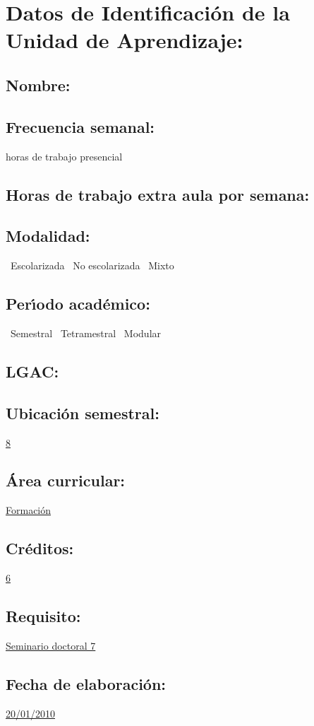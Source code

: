 \documentclass[10 pt]{article}
\begin{document}


\section{Datos de Identificaci\'{o}n de la Unidad de Aprendizaje:}
\subsection{Nombre:} 
\subsection{Frecuencia semanal:} horas de trabajo presencial 
\subsection{Horas de trabajo extra aula por semana:} 
\subsection{Modalidad:} \yes~Escolarizada \no~No escolarizada \no~Mixto
\subsection{Per\'{\i}odo acad\'{e}mico:} \yes~Semestral
\no~Tetramestral \no~Modular
\subsection{LGAC:} \underline{\odsi}
\subsection{Ubicaci\'{o}n semestral:} \underline{8}
\subsection{\'{A}rea curricular:} \underline{Formaci\'{o}n}
\subsection{Cr\'{e}ditos:} \underline{6}
\subsection{Requisito:} \underline{Seminario doctoral 7}
\subsection{Fecha de elaboraci\'{o}n:} \underline{20/01/2010}
\end{document}
